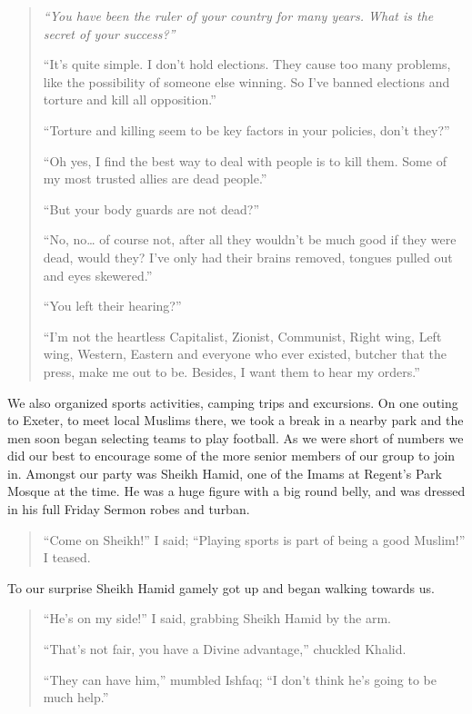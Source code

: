 \documentclass[12pt]{memoir}
\newcommand{\cor}[2]{#2} %
\begin{document}
\begin{quote}
\itshape
“You have been the ruler of your country for many years.
What is the secret of your success?”

“It’s quite simple.
I don’t hold elections.
They cause too many problems, like the possibility of someone else winning.
So I’ve banned elections and torture and kill all opposition.”

“Torture and killing seem to be key factors in your policies, don’t they?”

“Oh yes, I find the best way to deal with people is to kill them.
Some of my most trusted allies are dead people.”

“But your body guards are not dead?”

“No, no… of course not,
after all they wouldn’t be much good if they were dead, would they?
I’ve only had their brains removed, tongues pulled out and eyes skewered.”

“You left their hearing?”

“I’m not the heartless Capitalist, Zionist, Communist, Right wing,
Left wing, Western, Eastern and everyone who ever existed,
butcher that the press, make me out to be.
Besides, I want them to hear my orders.”
\end{quote}

We also organized sports activities, camping trips and excursions.
On one outing to Exeter, to meet local Muslims there,
we took a break in a nearby park
and the men soon began selecting teams to play football.
As we were short of numbers we did our best to encourage
some of the more senior members of our group to join in.
Amongst our party was Sheikh Hamid,
one of the Imams at \cor{Regents}{Regent’s} Park Mosque at the time.
He was a huge figure with a big round belly,
and was dressed in his full Friday Sermon robes and turban.

\begin{quote}
“Come on Sheikh!” I said;
“Playing sports is part of being a good Muslim!” I teased.
\end{quote}

To our surprise Sheikh Hamid gamely got up and began walking towards us.

\begin{quote}
“He’s on my side!”
I said, grabbing Sheikh Hamid by the arm.

“That’s not fair, you have a Divine advantage,” chuckled Khalid.

“They can have him,” mumbled Ishfaq;
“I don’t think he’s going to be much help.”
\end{quote}
\end{document}
